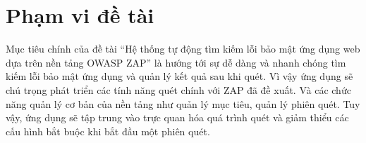 \section{Phạm vi đề tài}

\tab Mục tiêu chính của đề tài “Hệ thống tự động tìm kiếm lỗi bảo mật ứng dụng web dựa trên nền tảng OWASP ZAP” là hướng tới sự dễ dàng và nhanh chóng tìm kiếm lỗi bảo mật ứng dụng và quản lý kết quả sau khi quét.
Vì vậy ứng dụng sẽ chú trọng phát triển các tính năng quét chính với ZAP đã đề xuất.
Và các chức năng quản lý cơ bản của nền tảng như quản lý mục tiêu, quản lý phiên quét.
Tuy vậy, ứng dụng sẽ tập trung vào trực quan hóa quá trình quét và giảm thiểu các cấu hình bắt buộc khi bắt đầu một phiên quét.